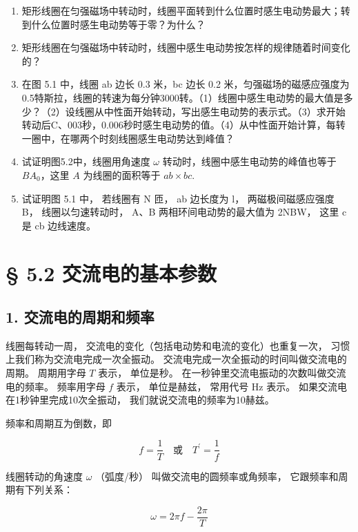 \begin{enumerate}
\def\labelenumi{\arabic{enumi}.}
\item
  矩形线圈在匀强磁场中转动时，线圈平面转到什么位置时感生电动势最大；转到什么位置时感生电动势等于零？为什么？
\item
  矩形线圈在匀强磁场中转动时，线圈中感生电动势按怎样的规律随着时间变化的？
\item
  在图 5.1 中，线圈 ab 边长 0.3 米，bc 边长 0.2
  米，匀强磁场的磁感应强度为0.5特斯拉，线圈的转速为每分钟3000转。（1）线圈中感生电动势的最大值是多少？（2）设线圈从中性面开始转动，写出感生电动势的表示式。（3）求开始转动后C、003秒，0.006秒时感生电动势的值。（4）从中性面开始计算，每转一圈中，在哪两个时刻线圈感生电动势达到峰值？
\item
  试证明图5.2中，线圈用角速度 \(\omega\)
  转动时，线圈中感生电动势的峰值也等于 \(BA_{0}\)，这里 \(A\)
  为线圈的面积等于 \(ab \times bc\).
\item
  试证明图 5.1 中， 若线圈有 N 匝， ab 边长度为 l， 两磁极间磁感应强度
  B， 线圈以匀速转动时， A、B 两相环间电动势的最大值为 2NBW， 这里 c 是
  cb 边线速度。
\end{enumerate}

\section{§ 5.2
交流电的基本参数}\label{ux4ea4ux6d41ux7535ux7684ux57faux672cux53c2ux6570}

\subsection{1.
交流电的周期和频率}\label{ux4ea4ux6d41ux7535ux7684ux5468ux671fux548cux9891ux7387}

线圈每转动一周， 交流电的变化（包括电动势和电流的变化）也重复一次，
习惯上我们称为交流电完成一次全振动。
交流电完成一次全振动的时间叫做交流电的周期。 周期用字母 \(T\) 表示，
单位是秒。 在一秒钟里交流电振动的次数叫做交流电的频率。 频率用字母 \(f\)
表示， 单位是赫兹， 常用代号 \(\mathrm{Hz}\) 表示。
如果交流电在1秒钟里完成10次全振动， 我们就说交流电的频率为10赫兹。

频率和周期互为倒数，即

\[
f = \frac{1}{T} \quad \text{或} \quad T^{\prime} = \frac{1}{f} \tag{5.5}
\]

线圈转动的角速度 \(\omega\) （弧度/秒） 叫做交流电的圆频率或角频率，
它跟频率和周期有下列关系：

\[
\omega = 2 \pi f - \frac{2 \pi}{T} \tag{5.6}
\]

